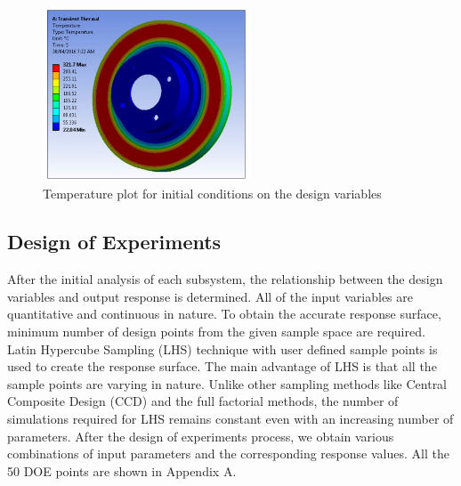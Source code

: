 \documentclass[12pt]{article}
\begin{document}
\begin{figure}[H]
\begin{center}
\includegraphics[width=0.55\textwidth]{temp.jpg}
\caption{Temperature plot for initial conditions on the design variables}
\label{temp}
\end{center}
\end{figure}
\subsection{Design of Experiments}
After the initial analysis of each subsystem, the relationship between the design variables and output response is determined. All of the input variables are quantitative and continuous in nature. To obtain the accurate response surface, minimum number of design points from the given sample space are required. Latin Hypercube Sampling (LHS) technique with user defined sample points is used to create the response surface. The main advantage of LHS is that all the sample points are varying in nature. Unlike other sampling methods like Central Composite Design (CCD) and the full factorial methods, the number of simulations required for LHS remains constant even with an increasing number of parameters. After the design of experiments process, we obtain various combinations of input parameters and the corresponding response values. All the 50 DOE points are shown in Appendix A.
\end{document}
